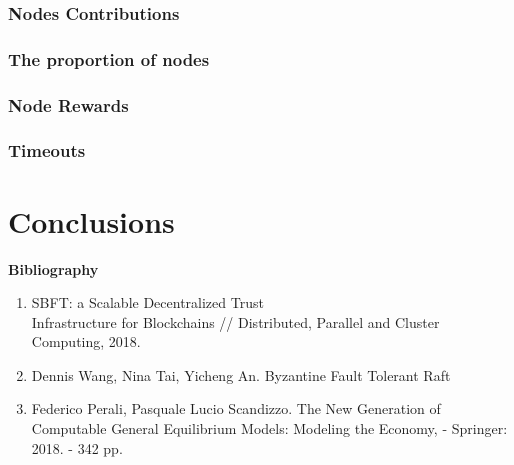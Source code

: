 \documentclass[12pt, a5paper]{article}
\begin{document}
\subsubsection{Nodes Contributions}
\subsubsection{The proportion of nodes}
\subsubsection{Node Rewards}
\subsubsection{Timeouts}
\section{Conclusions}

\textbf{\large{Bibliography}}
\small{\begin{enumerate}
\item SBFT: a Scalable Decentralized Trust 
\\
Infrastructure for Blockchains // Distributed, Parallel and Cluster Computing, 2018.
\item Dennis Wang, Nina Tai, Yicheng An. Byzantine Fault Tolerant Raft 
\item Federico Perali, Pasquale Lucio Scandizzo. The New Generation of Computable General Equilibrium Models: Modeling the Economy, - Springer: 2018. - 342 pp.
\end{enumerate}}
\end{document}
